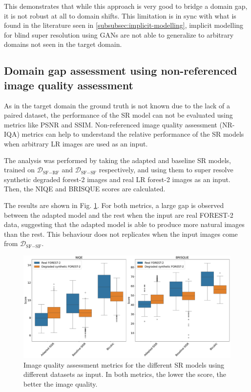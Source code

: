        
    This demonstrates that while this approach is very good to bridge a domain gap, it is not robust at all to domain shifts. 
    This limitation is in sync with what is found in the literature seen in \ref{subsubsec:implicit-modelling}, implicit modelling for blind super resolution using GANs are not able to generalize to arbitrary domains not seen in the target domain.

    \subsection{Domain gap assessment using non-referenced image quality assessment}

    As in the target domain the ground truth is not known due to the lack of a paired dataset, the performance of the SR model can not be evaluated using metrics like PSNR and SSIM.
    Non-referenced image quality assessment (NR-IQA) metrics can help to understand the relative performance of the SR models when arbitrary LR images are used as an input.
    
    The analysis was performed by taking the adapted and baseline SR models, trained on $\mathcal{D}_{\text{SF}-\text{RF}}$ and $\mathcal{D}_{\text{SF}-\text{SF}}$ respectively, and using them to super resolve synthetic degraded forest-2 images and real LR forest-2 images as an input.
    Then, the NIQE and BRISQUE scores are calculated.
    
    The results are shown in Fig. \ref{fig:5-target-iqa-results}.
    For both metrics, a large gap is observed between the adapted model and the rest when the input are real FOREST-2 data, suggesting that the adapted model is able to produce more natural images than the rest.
    This behaviour does not replicates when the input images come from $\mathcal{D}_{\text{SF}-\text{SF}}$.

    \begin{figure}[H]
        \centering
        \includegraphics[scale=0.28]{Includes/5-target-iqa-results.pdf}
        \caption{Image quality assessment metrics for the different SR models using different datasets as input. 
                In both metrics, the lower the score, the better the image quality.}
        \label{fig:5-target-iqa-results}
    \end{figure}
    

